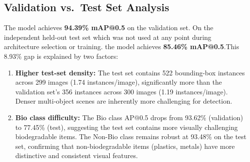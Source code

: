 \begin{table}[H]
\centering
\caption{Final Model Performance --- Validation vs.\ Test Set}
\label{tab:final_results}
\end{table}

\subsection{Validation vs.\ Test Set Analysis}

The model achieves \textbf{94.39\% mAP@0.5} on the validation set. On the independent held-out test set which was not used at any point during architecture selection or training. the model achieves \textbf{85.46\% mAP@0.5}.This 8.93\% gap is explained by two factors:

\begin{enumerate}
    \item \textbf{Higher test-set density:} The test set contains 522 bounding-box instances across 299 images (1.74 instances/image), significantly more than the validation set's 356 instances across 300 images (1.19 instances/image). Denser multi-object scenes are inherently more challenging for detection.
    \item \textbf{Bio class difficulty:} The Bio class AP@0.5 drops from 93.62\% (validation) to 77.45\% (test), suggesting the test set contains more visually challenging biodegradable items. The Non-Bio class remains robust at 93.48\% on the test set, confirming that non-biodegradable items (plastics, metals) have more distinctive and consistent visual features.
\end{enumerate}

